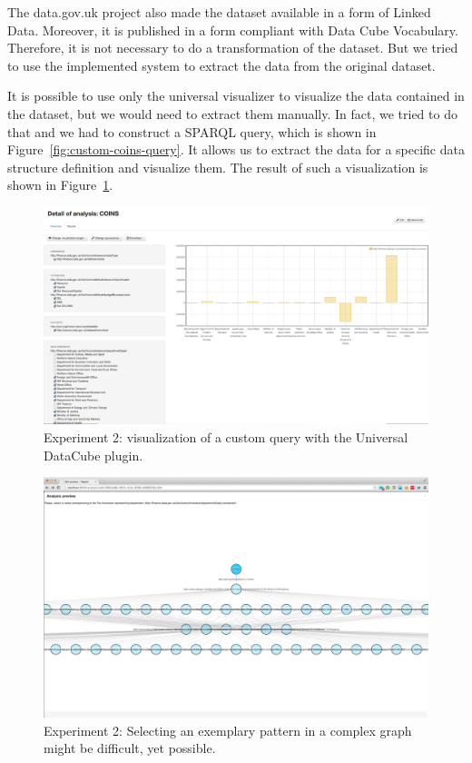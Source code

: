 The data.gov.uk project also made the dataset available in a form of Linked 
Data. Moreover, it is published in a form compliant with Data Cube Vocabulary.
Therefore, it is not necessary to do a transformation of the dataset. But we 
tried to use the implemented system to extract the data from the original 
dataset.

It is possible to use only the universal visualizer to visualize the data 
contained in the dataset, but we would need to extract them manually. In fact, 
we tried to do that and we had to construct a SPARQL query, which is shown in
Figure~\ref{fig:custom-coins-query}. It allows us to extract the data for a specific data structure 
definition and visualize them. The result of such a visualization is shown in 
Figure~\ref{fig:payola-exp-02}. 

\begin{figure}
  \centering
  \includegraphics[width=140mm]{img/payola-exp-02.png}
  \caption{Experiment 2: visualization of a custom query with the Universal DataCube plugin.}
  \label{fig:payola-exp-02}
\end{figure}

\begin{figure}
  \centering
  \includegraphics[width=140mm]{img/payola-exp-02-pattern.png}
  \caption{Experiment 2: Selecting an exemplary pattern in a complex graph might be difficult, yet possible.}
  \label{fig:payola-exp-02-pattern}
\end{figure}

